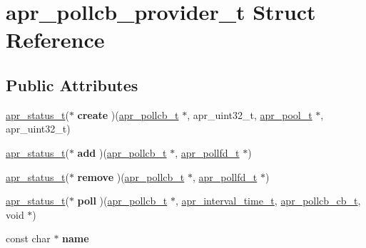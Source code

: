 \hypertarget{structapr__pollcb__provider__t}{}\section{apr\+\_\+pollcb\+\_\+provider\+\_\+t Struct Reference}
\label{structapr__pollcb__provider__t}
\subsection*{Public Attributes}
\begin{DoxyCompactItemize}
\item 
\mbox{\label{structapr__pollcb__provider__t_a692a11334282a65e72bae9b9ecb618bf}} 
\mbox{\hyperlink{group__apr__errno_gaf76ee4543247e9fb3f3546203e590a6c}{apr\+\_\+status\+\_\+t}}($\ast$ {\bfseries create} )(\mbox{\hyperlink{structapr__pollcb__t}{apr\+\_\+pollcb\+\_\+t}} $\ast$, apr\+\_\+uint32\+\_\+t, \mbox{\hyperlink{group__apr__pools_gaf137f28edcf9a086cd6bc36c20d7cdfb}{apr\+\_\+pool\+\_\+t}} $\ast$, apr\+\_\+uint32\+\_\+t)
\item 
\mbox{\label{structapr__pollcb__provider__t_af48d581c174c9342b25425d6534a9a38}} 
\mbox{\hyperlink{group__apr__errno_gaf76ee4543247e9fb3f3546203e590a6c}{apr\+\_\+status\+\_\+t}}($\ast$ {\bfseries add} )(\mbox{\hyperlink{structapr__pollcb__t}{apr\+\_\+pollcb\+\_\+t}} $\ast$, \mbox{\hyperlink{structapr__pollfd__t}{apr\+\_\+pollfd\+\_\+t}} $\ast$)
\item 
\mbox{\label{structapr__pollcb__provider__t_a587ac036405acca0125e4cb32571683d}} 
\mbox{\hyperlink{group__apr__errno_gaf76ee4543247e9fb3f3546203e590a6c}{apr\+\_\+status\+\_\+t}}($\ast$ {\bfseries remove} )(\mbox{\hyperlink{structapr__pollcb__t}{apr\+\_\+pollcb\+\_\+t}} $\ast$, \mbox{\hyperlink{structapr__pollfd__t}{apr\+\_\+pollfd\+\_\+t}} $\ast$)
\item 
\mbox{\label{structapr__pollcb__provider__t_a7229a072271b269b3dd5fca868df01e3}} 
\mbox{\hyperlink{group__apr__errno_gaf76ee4543247e9fb3f3546203e590a6c}{apr\+\_\+status\+\_\+t}}($\ast$ {\bfseries poll} )(\mbox{\hyperlink{structapr__pollcb__t}{apr\+\_\+pollcb\+\_\+t}} $\ast$, \mbox{\hyperlink{group__apr__time_gaae2129185a395cc393f76fabf4f43e47}{apr\+\_\+interval\+\_\+time\+\_\+t}}, \mbox{\hyperlink{group__apr__poll_ga1dcd8c87e233dbf105e83d50ef601f55}{apr\+\_\+pollcb\+\_\+cb\+\_\+t}}, void $\ast$)
\item 
\mbox{\label{structapr__pollcb__provider__t_ac4303695db9501a328d7dd52dae4d2d5}} 
const char $\ast$ {\bfseries name}
\end{DoxyCompactItemize}


